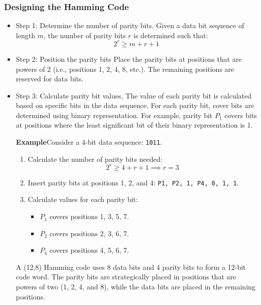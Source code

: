 \documentclass{article}
\numberwithin{equation}{section}
\numberwithin{figure}{section}
\numberwithin{table}{section}
\begin{document}
\subsubsection{Designing the Hamming Code}
\begin{itemize}

\item {Step 1: Determine the number of parity bits.}
Given a data bit sequence of length \(m\), the number of parity bits \(r\) is determined such that:
\begin{equation}
2^r \geq m + r + 1
\end{equation}

\item  {Step 2: Position the parity bits}
Place the parity bits at positions that are powers of 2 (i.e., positions 1, 2, 4, 8, etc.). The remaining positions are reserved for data bits.

\item {Step 3: Calculate parity bit values,}
The value of each parity bit is calculated based on specific bits in the data sequence. For each parity bit, cover bits are determined using binary representation. For example, parity bit \(P_1\) covers bits at positions where the least significant bit of their binary representation is 1.

\textbf{Example}Consider a 4-bit data sequence: \texttt{1011}.

\begin{enumerate}
    \item Calculate the number of parity bits needed:
    \begin{equation}
    2^r \geq 4 + r + 1 \implies r = 3
    \end{equation}
    \item Insert parity bits at positions 1, 2, and 4: \texttt{P1, P2, 1, P4, 0, 1, 1}.
    \item Calculate values for each parity bit:
    \begin{itemize}
        \item \(P_1\) covers positions 1, 3, 5, 7.
        \item \(P_2\) covers positions 2, 3, 6, 7.
        \item \(P_4\) covers positions 4, 5, 6, 7.
    \end{itemize}
\end{enumerate}
A (12,8) Hamming code uses 8 data bits and 4 parity bits to form a 12-bit code word. The parity bits are strategically placed in positions that are powers of two (1, 2, 4, and 8), while the data bits are placed in the remaining positions.\cite{khadir}
\end{itemize}
\end{document}
